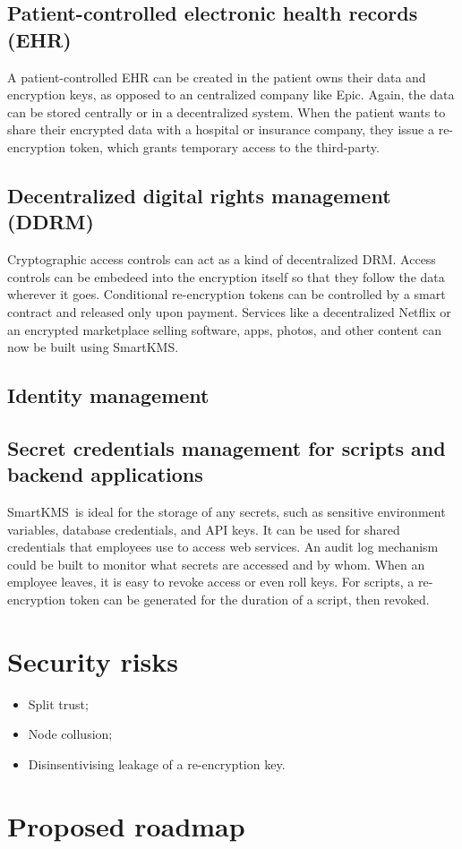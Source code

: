 \documentclass[notitlepage,longbibliography]{revtex4-1}
\newcommand{\kms}{SmartKMS}
\begin{document}
\subsection{Patient-controlled electronic health records (EHR)}
A patient-controlled EHR can be created in the patient owns their data and encryption keys, as opposed to an centralized
company like Epic.
Again, the data can be stored centrally or in a decentralized system.
When the patient wants to share their encrypted data with a hospital or insurance company, they issue a re-encryption token,
which grants temporary access to the third-party.

\subsection{Decentralized digital rights management (DDRM)}
Cryptographic access controls can act as a kind of decentralized DRM.
Access controls can be embedeed into the encryption itself so that they follow the data wherever it goes.
Conditional re-encryption tokens can be controlled by a smart contract and released only upon payment.
Services like a decentralized Netflix or an encrypted marketplace selling software, apps, photos, and other content
can now be built using \kms.

\subsection{Identity management}

\subsection{Secret credentials management for scripts and backend applications}
\kms~is ideal for the storage of any secrets, such as sensitive environment variables, database credentials, and API keys.
It can be used for shared credentials that employees use to access web services.
An audit log mechanism could be built to monitor what secrets are accessed and by whom.
When an employee leaves, it is easy to revoke access or even roll keys.
For scripts, a re-encryption token can be generated for the duration of a script, then revoked.

\section{Security risks}

\begin{itemize}
    \item Split trust;
    \item Node collusion;
    \item Disinsentivising leakage of a re-encryption key.
\end{itemize}

\section{Proposed roadmap}


\end{document}
